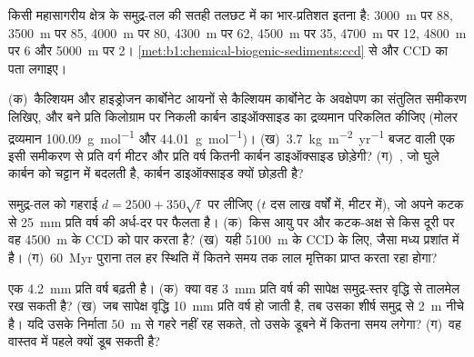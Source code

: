 \begin{exercise}[$\star$]\label{exo:b1:chemical-biogenic-sediments:4}
किसी महासागरीय क्षेत्र के समुद्र-तल की सतही तलछट में  का भार-प्रतिशत इतना है: \qty{3000}{m} पर 88, \qty{3500}{m} पर 85, \qty{4000}{m} पर 80, \qty{4300}{m} पर 62, \qty{4500}{m} पर 35, \qty{4700}{m} पर 12, \qty{4800}{m} पर 6 और \qty{5000}{m} पर 2। \cref{met:b1:chemical-biogenic-sediments:ccd} से  और CCD का पता लगाइए।
\end{exercise}

\begin{exercise}[$\star\star$]\label{exo:b1:chemical-biogenic-sediments:5}
(क)~कैल्शियम और हाइड्रोजन कार्बोनेट आयनों से कैल्शियम कार्बोनेट के अवक्षेपण का संतुलित समीकरण लिखिए, और बने प्रति किलोग्राम  पर निकली कार्बन डाइऑक्साइड का द्रव्यमान परिकलित कीजिए (मोलर द्रव्यमान \qty{100.09}{g.mol^{-1}} और \qty{44.01}{g.mol^{-1}})। (ख)~\qty{3.7}{kg.m^{-2}.yr^{-1}} बजट वाली एक  इसी समीकरण से प्रति वर्ग मीटर और प्रति वर्ष कितनी कार्बन डाइऑक्साइड छोड़ेगी? (ग)~, जो घुले कार्बन को चट्टान में बदलती है, कार्बन डाइऑक्साइड क्यों छोड़ती है?
\end{exercise}

\begin{exercise}[$\star\star$]\label{exo:b1:chemical-biogenic-sediments:6}
समुद्र-तल को गहराई $d = 2500 + 350\sqrt t$ पर लीजिए ($t$ दस लाख वर्षों में, मीटर में), जो अपने कटक से \qty{25}{mm} प्रति वर्ष की अर्ध-दर पर फैलता है। (क)~किस आयु पर और कटक-अक्ष से किस दूरी पर वह \qty{4500}{m} के CCD को पार करता है? (ख)~यही \qty{5100}{m} के CCD के लिए, जैसा मध्य प्रशांत में है। (ग)~\qty{60}{Myr} पुराना तल हर स्थिति में कितने समय तक लाल मृत्तिका प्राप्त करता रहा होगा?
\end{exercise}

\begin{exercise}[$\star\star$]\label{exo:b1:chemical-biogenic-sediments:7}
एक  \qty{4.2}{mm} प्रति वर्ष बढ़ती है। (क)~क्या वह \qty{3}{mm} प्रति वर्ष की सापेक्ष समुद्र-स्तर वृद्धि से तालमेल रख सकती है? (ख)~जब सापेक्ष वृद्धि \qty{10}{mm} प्रति वर्ष हो जाती है, तब उसका शीर्ष समुद्र से \qty{2}{m} नीचे है। यदि उसके निर्माता \qty{50}{m} से गहरे नहीं रह सकते, तो उसके डूबने में कितना समय लगेगा? (ग)~वह वास्तव में पहले क्यों डूब सकती है?
\end{exercise}

